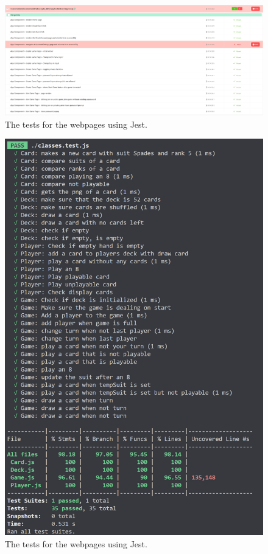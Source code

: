 \documentclass{article}
\begin{document}
\begin{figure}[h]
\centering
\includegraphics[width=\linewidth]{tests2_2.png}
\caption{\label{fig:testss2_2}The tests for the webpages using Jest.}
\end{figure}

\begin{figure}[h]
\centering
\includegraphics[width=\linewidth]{testss2_3.png}
\caption{\label{fig:testss2_3}The tests for the webpages using Jest.}
\end{figure}
\end{document}
